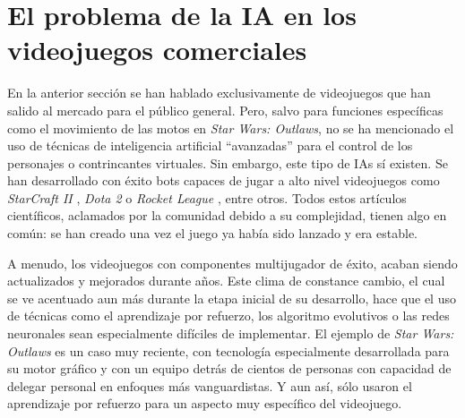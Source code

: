 


\section{El problema de la IA en los videojuegos comerciales} \label{sec:problema_ia_videojuegos}

En la anterior sección se han hablado exclusivamente de videojuegos que han salido al mercado para el público general. Pero, salvo para funciones específicas como el movimiento de las motos en \textit{Star Wars: Outlaws}, no se ha mencionado el uso de técnicas de inteligencia artificial ``avanzadas'' para el control de los personajes o contrincantes virtuales. Sin embargo, este tipo de IAs sí existen. Se han desarrollado con éxito bots capaces de jugar a alto nivel videojuegos como \textit{StarCraft II} \cite{vinyals_grandmaster_2019}, \textit{Dota 2} \cite{openai_dota_2019} o \textit{Rocket League} \cite{moschopoulos_lucy-skg_2023}, entre otros. Todos estos artículos científicos, aclamados por la comunidad debido a su complejidad, tienen algo en común: se han creado una vez el juego ya había sido lanzado y era estable.

A menudo, los videojuegos con componentes multijugador de éxito, acaban siendo actualizados y mejorados durante años. Este clima de constance cambio, el cual se ve acentuado aun más durante la etapa inicial de su desarrollo, hace que el uso de técnicas como el aprendizaje por refuerzo, los algoritmo evolutivos o las redes neuronales sean especialmente difíciles de implementar. El ejemplo de \textit{Star Wars: Outlaws} es un caso muy reciente, con tecnología especialmente desarrollada para su motor gráfico y con un equipo detrás de cientos de personas con capacidad de delegar personal en enfoques más vanguardistas. Y aun así, sólo usaron el aprendizaje por refuerzo para un aspecto muy específico del videojuego.


